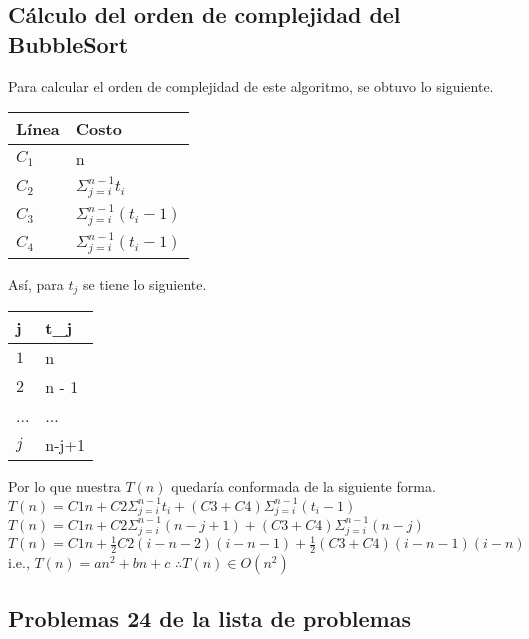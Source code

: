 \documentclass[12pt,twoside]{article}
\begin{document}
\subsection{Cálculo del orden de complejidad del BubbleSort}
Para calcular el orden de complejidad de este algoritmo, se obtuvo lo siguiente.
\begin{center}
\begin{tabular}{|l|l|}
\hline
Línea & Costo\\
\hline
$C_{1}$ &n\\
\hline
$C_{2}$ &$\Sigma_{j=i}^{n-1}t_{i}$\\
\hline
$C_{3}$ &$\Sigma_{j=i}^{n-1}(t_{i} - 1)$\\
\hline
$C_{4}$ &$\Sigma_{j=i}^{n-1}(t_{i} - 1)$\\
\hline
\end{tabular}
\end{center}
Así, para $t_j$ se tiene lo siguiente.
\begin{center}
\begin{tabular}{|l|l|}
\hline
j & t_j\\
\hline
$1$ &n\\
\hline
$2$ &n - 1\\
\hline
...&...\\
\hline
$j$ &n-j+1\\
\hline
\end{tabular}
\end{center}
Por lo que nuestra $T(n)$ quedaría conformada de la siguiente forma.\newline
$T(n) = C1n + C2\Sigma_{j=i}^{n-1}t_{i} + (C3 + C4)\Sigma_{j=i}^{n-1}(t_{i} - 1)$\newline
$T(n) = C1n + C2\Sigma_{j=i}^{n-1}(n-j+1) + (C3 + C4)\Sigma_{j=i}^{n-1}(n-j)$\newline
$T(n) = C1n + \frac{1}{2}C2(i-n-2)(i-n-1) + \frac{1}{2}(C3 + C4)(i-n-1)(i-n)$\newline
i.e.,\newline
$T(n) = an^2 + bn + c$\newline
$\therefore T(n) \in O(n^2)$
\subsection{Problemas 24 de la lista de problemas}
\end{document}
